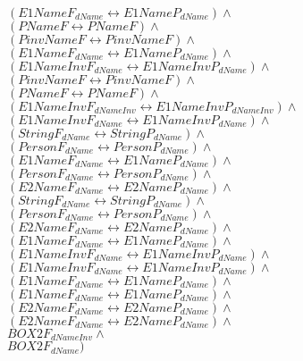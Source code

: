 \documentclass[a4paper,10pt]{article}
\begin{document}
 $ (E1NameF_{dName} \leftrightarrow E1NameP_{dName}) \land $ \\ 
 $ (PNameF \leftrightarrow PNameF) \land $ \\ 
 $ (PinvNameF \leftrightarrow PinvNameF) \land $ \\ 
 $ (E1NameF_{dName} \leftrightarrow E1NameP_{dName}) \land $ \\ 
 $ (E1NameInvF_{dName} \leftrightarrow E1NameInvP_{dName}) \land $ \\ 
 $ (PinvNameF \leftrightarrow PinvNameF) \land $ \\ 
 $ (PNameF \leftrightarrow PNameF) \land $ \\ 
 $ (E1NameInvF_{dNameInv} \leftrightarrow E1NameInvP_{dNameInv}) \land $ \\ 
 $ (E1NameInvF_{dName} \leftrightarrow E1NameInvP_{dName}) \land $ \\ 
 $ (StringF_{dName} \leftrightarrow StringP_{dName}) \land $ \\ 
 $ (PersonF_{dName} \leftrightarrow PersonP_{dName}) \land $ \\ 
 $ (E1NameF_{dName} \leftrightarrow E1NameP_{dName}) \land $ \\ 
 $ (PersonF_{dName} \leftrightarrow PersonP_{dName}) \land $ \\ 
 $ (E2NameF_{dName} \leftrightarrow E2NameP_{dName}) \land $ \\ 
 $ (StringF_{dName} \leftrightarrow StringP_{dName}) \land $ \\ 
 $ (PersonF_{dName} \leftrightarrow PersonP_{dName}) \land $ \\ 
 $ (E2NameF_{dName} \leftrightarrow E2NameP_{dName}) \land $ \\ 
 $ (E1NameF_{dName} \leftrightarrow E1NameP_{dName}) \land $ \\ 
 $ (E1NameInvF_{dName} \leftrightarrow E1NameInvP_{dName}) \land $ \\ 
 $ (E1NameInvF_{dName} \leftrightarrow E1NameInvP_{dName}) \land $ \\ 
 $ (E1NameF_{dName} \leftrightarrow E1NameP_{dName}) \land $ \\ 
 $ (E1NameF_{dName} \leftrightarrow E1NameP_{dName}) \land $ \\ 
 $ (E2NameF_{dName} \leftrightarrow E2NameP_{dName}) \land $ \\ 
 $ (E2NameF_{dName} \leftrightarrow E2NameP_{dName}) \land $ \\ 
 $ BOX2F_{dNameInv} \land $ \\ 
 $ BOX2F_{dName})$ 
\end{document}
